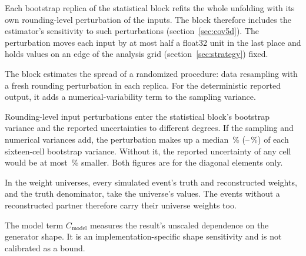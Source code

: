 Each bootstrap replica of the statistical block refits the whole unfolding with its own rounding-level perturbation of the inputs. The block therefore includes the estimator's sensitivity to such perturbations (section~\ref{sec:cov5d}). The perturbation moves each input by at most half a float32 unit in the last place and holds values on an edge of the analysis grid (section~\ref{sec:strategy}) fixed.

The block estimates the spread of a randomized procedure: data resampling with a fresh rounding perturbation in each replica. For the deterministic reported output, it adds a numerical-variability term to the sampling variance.

Rounding-level input perturbations enter the statistical block's bootstrap variance and the reported uncertainties to different degrees. If the sampling and numerical variances add, the perturbation makes up a median \,\% (--\,\%) of each sixteen-cell bootstrap variance. Without it, the reported uncertainty of any cell would be at most \,\% smaller. Both figures are for the diagonal elements only.

In the weight universes, every simulated event's truth and reconstructed weights, and the truth denominator, take the universe's values. The events without a reconstructed partner therefore carry their universe weights too.

The model term $C_{\mathrm{model}}$ measures the result's unscaled dependence on the generator shape. It is an implementation-specific shape sensitivity and is not calibrated as a bound.

